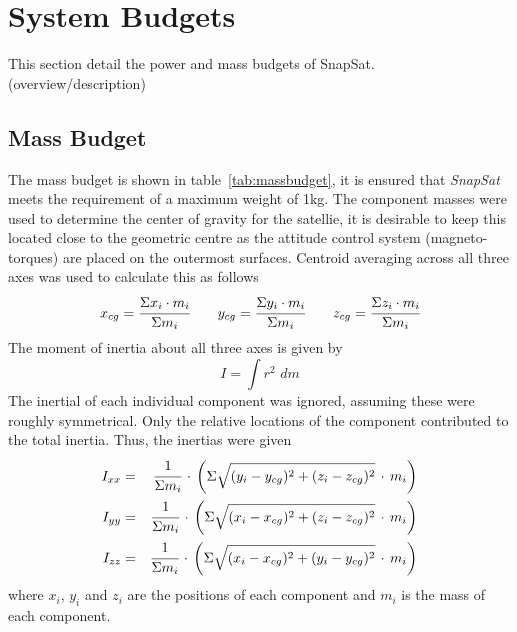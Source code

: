 \section{System Budgets}
This section detail the power and mass budgets of SnapSat. (overview/description)


\subsection{Mass Budget} 
The mass budget is shown in table~\ref{tab:massbudget}, it is ensured that \textit{SnapSat} meets the requirement of a maximum weight of 1kg. The component masses were used to determine the center of gravity for the satellie, it is desirable to keep this located close to the geometric centre as the attitude control system (magneto-torques) are placed on the outermost surfaces. Centroid averaging across all three axes was used to calculate this as follows
\[
x_{cg} = \cfrac{\Sigma x_i\cdot m_i}{\Sigma m_i} \qquad y_{cg} = \cfrac{\Sigma y_i\cdot m_i}{\Sigma m_i} \qquad z_{cg} = \cfrac{\Sigma z_i\cdot m_i}{\Sigma m_i}
\]
\noindent
The moment of inertia about all three axes is given by
\[ I = \int r^2\,\,dm \]
\noindent
The inertial of each individual component was ignored, assuming these were roughly symmetrical. Only the relative locations of the component contributed to the total inertia. Thus, the inertias were given
\begin{eqnarray} 
I_{xx} &=& \cfrac{1}{\Sigma m_i}\,\cdot\,\left( \Sigma \sqrt{(y_i-y_{cg})^2+(z_i-z_{cg})^2}\,\cdot\,m_i \right) \\
I_{yy} &=& \cfrac{1}{\Sigma m_i}\,\cdot\,\left( \Sigma \sqrt{(x_i-x_{cg})^2+(z_i-z_{cg})^2}\,\cdot\,m_i \right) \\
I_{zz} &=& \cfrac{1}{\Sigma m_i}\,\cdot\,\left( \Sigma \sqrt{(x_i-x_{cg})^2+(y_i-y_{cg})^2}\,\cdot\,m_i \right) 
\end{eqnarray} 
\noindent
where $x_i$, $y_i$ and $z_i$ are the positions of each component and $m_i$ is the mass of each component.

